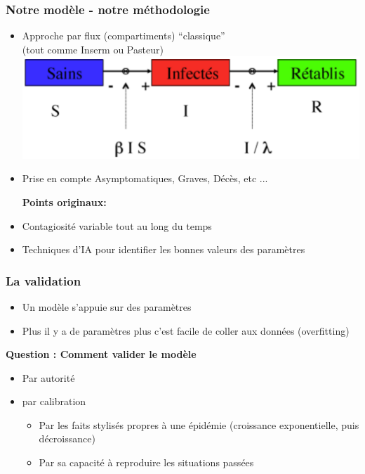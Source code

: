 \documentclass[a4paper]{cours-bdd}
\begin{document}
\begin{frame}[fragile]
  \frametitle{Notre modèle - notre méthodologie}
  \begin{itemize}
  \item Approche par flux (compartiments) ``classique'' \\ (tout comme Inserm ou Pasteur)
    \includegraphics[width=0.6\linewidth]{modeleSIR.png} \\
  \item Prise en compte Asymptomatiques, Graves, Décès, etc ...
    
    \bigskip    
    \textbf{Points originaux:}
  \item Contagiosité variable tout au long du temps
  \item Techniques d'IA pour identifier les bonnes valeurs des paramètres 
  \end{itemize}
  
\end{frame}




\begin{frame}[fragile]
  \frametitle{La validation}
  \begin{itemize}
  \item Un modèle s'appuie sur des paramètres
  \item Plus il y a de paramètres plus c'est facile de coller aux données (overfitting)
  \end{itemize}

  \bigskip
  
  \textbf{Question : Comment valider le modèle}

  \begin{itemize}
  \item Par autorité
    
  \item par calibration
    \begin{itemize}
    \item Par les faits stylisés propres à une épidémie 
      (croissance exponentielle, puis décroissance)
    \item Par sa capacité à reproduire les situations passées %
  \end{itemize}

  \end{itemize}
\end{frame}
\end{document}
